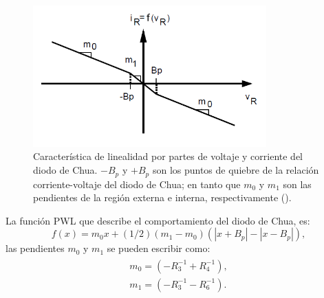 \documentclass{article}
\begin{document}
    \begin{figure}[h!]
        \centering
        \includegraphics[width=0.8\textwidth]{Chua/DiodoChua.png}
        \caption{Característica de linealidad por partes de voltaje y corriente del diodo de Chua. $-B_{p}$ y $+B_{p}$ son los puntos de quiebre de la relación corriente-voltaje del diodo de Chua; en tanto que $m_{0}$ y $m_{1}$ son las pendientes de la región externa e interna, respectivamente (\cite{kennedy1992robust}).} 
        \label{fig:diodo teórico}
    \end{figure} 
    La función PWL que describe el comportamiento del diodo de Chua, es:
    \begin{equation}\label{f(x) PWL}
        f(x) = m_{0}x + (1/2)(m_{1}-m_{0})(|x+B_p|-|x-B_p|),
    \end{equation}
    las pendientes $m_0$ y $m_1$ se pueden escribir como:
    \begin{eqnarray}\label{pendientes}
        \begin{aligned}
            m_0=(-R_3^{-1} +R_4^{-1}),\\
            m_1=(-R_3^{-1} -R_6^{-1}).
        \end{aligned}
    \end{eqnarray}
\end{document}
